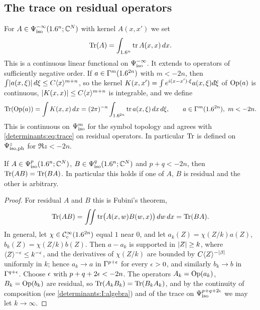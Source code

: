\subsection*{The trace on residual operators}
For $A\in\Psi^{-\infty}_{\mathrm{iso}}(1.6^n;\mathbb{C}^N)$ with kernel $A(x,x')$ we set
\begin{equation}\label{determinants:eq:trace}
  \operatorname{Tr}(A)=\int_{1.6^n}\operatorname{tr} A(x,x)\,dx .
\end{equation}
This is a continuous linear functional on $\Psi^{-\infty}_{\mathrm{iso}}$. It extends to
operators of sufficiently negative order. If $a\in\Gamma^{m}(1.6^{2n})$ with
$m<-2n$, then $\int\lvert a(x,\xi)\rvert\,d\xi\le C\langle x\rangle^{m+n}$, so the kernel
$K(x,x')=\int e^{i(x-x')\cdot\xi}a(x,\xi)\,\dbar\xi$ of $\operatorname{Op}(a)$ is continuous,
$\lvert K(x,x)\rvert\le C\langle x\rangle^{m+n}$ is integrable, and we define
\begin{equation}\label{determinants:eq:trace-symbol}
  \operatorname{Tr}(\operatorname{Op}(a))=\int K(x,x)\,dx=(2\pi)^{-n}\int_{1.6^{2n}}\operatorname{tr} a(x,\xi)\,dx\,d\xi,
  \qquad a\in\Gamma^{m}(1.6^{2n}),\ m<-2n.
\end{equation}
This is continuous on $\Psi^{m}_{\mathrm{iso}}$ for the symbol topology and agrees with
\eqref{determinants:eq:trace} on residual operators. In particular $\operatorname{Tr}$ is
defined on $\Psi^{z}_{\mathrm{iso,ph}}$ for $\Re z<-2n$.

\begin{lemma}\label{determinants:lem:trace-property}
  If $A\in\Psi^{p}_{\mathrm{iso}}(1.6^n;\mathbb{C}^N)$, $B\in\Psi^{q}_{\mathrm{iso}}(1.6^n;\mathbb{C}^N)$ and
  $p+q<-2n$, then $\operatorname{Tr}(AB)=\operatorname{Tr}(BA)$. In particular this holds if one of $A$,
  $B$ is residual and the other is arbitrary.
\end{lemma}
\begin{proof}
  For residual $A$ and $B$ this is Fubini's theorem,
  \begin{equation*}
    \operatorname{Tr}(AB)=\iint\operatorname{tr}\bigl(A(x,w)B(w,x)\bigr)\,dw\,dx=\operatorname{Tr}(BA).
  \end{equation*}
  In general, let
  $\chi\in\mathcal{C}^\infty_{\mathrm{c}}(1.6^{2n})$ equal $1$ near $0$, and let $a_k(Z)=\chi(Z/k)a(Z)$,
  $b_k(Z)=\chi(Z/k)b(Z)$. Then $a-a_k$ is supported in $\lvert Z\rvert\ge k$, where
  $\langle Z\rangle^{-\epsilon}\le k^{-\epsilon}$, and the derivatives of $\chi(Z/k)$ are
  bounded by $C\langle Z\rangle^{-\lvert \beta\rvert}$ uniformly in $k$; hence $a_k\to a$ in
  $\Gamma^{p+\epsilon}$ for every $\epsilon>0$, and similarly $b_k\to b$ in
  $\Gamma^{q+\epsilon}$. Choose $\epsilon$ with $p+q+2\epsilon<-2n$. The operators
  $A_k=\operatorname{Op}(a_k)$, $B_k=\operatorname{Op}(b_k)$ are residual, so $\operatorname{Tr}(A_kB_k)=\operatorname{Tr}(B_kA_k)$,
  and by the continuity of composition (see \ref{determinants:I:algebra}) and of
  the trace on $\Psi^{p+q+2\epsilon}_{\mathrm{iso}}$ we may let $k\to\infty$.
\end{proof}


